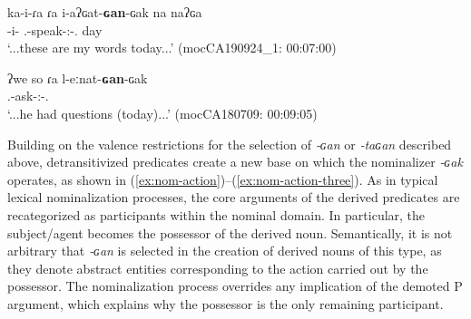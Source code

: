 \documentclass[12pt]{article}
\begin{document}
 
 \begin{exe}
\ex 
\gll ka-i-ɾa ɾa i-aʔɢat-\textbf{ɢan}-ɢak na naʔɢa \\
 {\DetOne}-{i}-{\DetFour} {\DetFour} {\First\Sg.\Poss}-speak-{\Vm:\Intr}-{\Nmlz.\Act} {\DetThree} day\\
\trans `...these are my words today...'  \hfill (mocCA190924\_1: 00:07:00) \label{ex:nom-action-two}
\end{exe}
 
 \begin{exe}
\ex 
\gll ʔwe so ɾa l-eːnat-\textbf{ɢan}-ɢak  \\
 {\Exist} {\DetTwo} {\DetThree} {\Third.\Poss}-ask-{\Vm:\Intr}-{\Nmlz.\Act}\\
\trans `...he had questions (today)...'  \hfill (mocCA180709: 00:09:05) \label{ex:nom-action-three}
\end{exe}
 

 Building on the valence restrictions for the selection of \textit{‑ɢan} or \textit{‑taɢan} described above, detransitivized predicates create a new base on which the nominalizer \textit{‑ɢak} operates, as shown in (\ref{ex:nom-action})--(\ref{ex:nom-action-three}). As in typical lexical nominalization processes, the core arguments of the derived predicates are recategorized as participants within the nominal domain. In particular, the subject/agent becomes the possessor of the derived noun. Semantically, it is not arbitrary that \textit{‑ɢan} is selected in the creation of derived nouns of this type, as they denote abstract entities corresponding to the action carried out by the possessor. The nominalization process overrides any implication of the demoted P argument, which explains why the possessor is the only remaining participant. 
 

 

\end{document}
